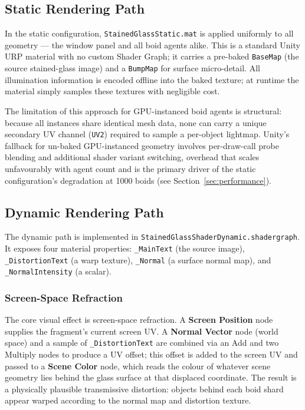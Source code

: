 \documentclass[12pt]{article}
\begin{document}
\subsection{Static Rendering Path}
\label{subsec:static-path}

In the static configuration, \texttt{StainedGlassStatic.mat} is applied uniformly to all geometry --- the window panel and all boid agents alike. This is a standard Unity URP material with no custom Shader Graph; it carries a pre-baked \texttt{BaseMap} (the source stained-glass image) and a \texttt{BumpMap} for surface micro-detail. All illumination information is encoded offline into the baked texture; at runtime the material simply samples these textures with negligible cost. 

The limitation of this approach for GPU-instanced boid agents is structural: because all instances share identical mesh data, none can carry a unique secondary UV channel (\texttt{UV2}) required to sample a per-object lightmap. Unity's fallback for un-baked GPU-instanced geometry involves per-draw-call probe blending and additional shader variant switching, overhead that scales unfavourably with agent count and is the primary driver of the static configuration's degradation at 1000 boids (see Section~\ref{sec:performance}).

\subsection{Dynamic Rendering Path}
\label{subsec:dynamic-path}

The dynamic path is implemented in \texttt{StainedGlassShaderDynamic.shadergraph}. It exposes four material properties: \texttt{\_MainText} (the source image), \texttt{\_DistortionText} (a warp texture), \texttt{\_Normal} (a surface normal map), and \texttt{\_NormalIntensity} (a scalar).

\subsubsection{Screen-Space Refraction}

The core visual effect is screen-space refraction. A \textbf{Screen Position} node supplies the fragment's current screen UV. A \textbf{Normal Vector} node (world space) and a sample of \texttt{\_DistortionText} are combined via an Add and two Multiply nodes to produce a UV offset; this offset is added to the screen UV and passed to a \textbf{Scene Color} node, which reads the colour of whatever scene geometry lies behind the glass surface at that displaced coordinate. The result is a physically plausible transmissive distortion: objects behind each boid shard appear warped according to the normal map and distortion texture.
\end{document}
